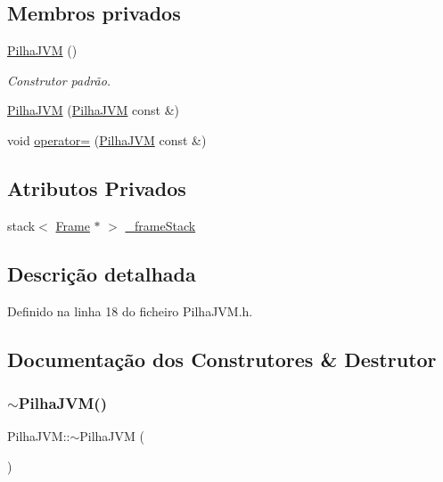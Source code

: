 \subsection*{Membros privados}
\begin{DoxyCompactItemize}
\item 
\hyperlink{classPilhaJVM_a7f0451ca9cf124f5098d43928566fadf}{Pilha\+J\+VM} ()
\begin{DoxyCompactList}\small\item\em Construtor padrão. \end{DoxyCompactList}\item 
\hyperlink{classPilhaJVM_a051085f51d79d3333356c5d36bef4687}{Pilha\+J\+VM} (\hyperlink{classPilhaJVM}{Pilha\+J\+VM} const \&)
\item 
void \hyperlink{classPilhaJVM_a636c01ded057b339aa00486003db9037}{operator=} (\hyperlink{classPilhaJVM}{Pilha\+J\+VM} const \&)
\end{DoxyCompactItemize}
\subsection*{Atributos Privados}
\begin{DoxyCompactItemize}
\item 
stack$<$ \hyperlink{classFrame}{Frame} $\ast$ $>$ \hyperlink{classPilhaJVM_a09290179ef6c914aa32297ab9dae94ed}{\+\_\+frame\+Stack}
\end{DoxyCompactItemize}


\subsection{Descrição detalhada}


Definido na linha 18 do ficheiro Pilha\+J\+V\+M.\+h.



\subsection{Documentação dos Construtores \& Destrutor}
\mbox{\label{classPilhaJVM_a7995ffc4e2ca9b149b83293cbbe0ea1b}} 
\subsubsection{\texorpdfstring{$\sim$\+Pilha\+J\+V\+M()}{~PilhaJVM()}}
{\footnotesize\ttfamily Pilha\+J\+V\+M\+::$\sim$\+Pilha\+J\+VM (\begin{DoxyParamCaption}{ }\end{DoxyParamCaption})}



